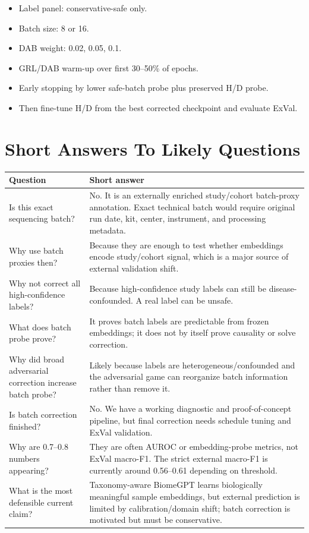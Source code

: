 \documentclass[11pt]{article}
\begin{document}
\begin{itemize}
  \item Label panel: conservative-safe only.
  \item Batch size: 8 or 16.
  \item DAB weight: 0.02, 0.05, 0.1.
  \item GRL/DAB warm-up over first 30--50\% of epochs.
  \item Early stopping by lower safe-batch probe plus preserved H/D probe.
  \item Then fine-tune H/D from the best corrected checkpoint and evaluate ExVal.
\end{itemize}

\section{Short Answers To Likely Questions}

\begin{longtable}{p{}p{}}
\toprule
Question & Short answer \\
\midrule
\endhead
Is this exact sequencing batch? &
No. It is an externally enriched study/cohort batch-proxy annotation. Exact technical
batch would require original run date, kit, center, instrument, and processing metadata. \\
Why use batch proxies then? &
Because they are enough to test whether embeddings encode study/cohort signal, which is a
major source of external validation shift. \\
Why not correct all high-confidence labels? &
Because high-confidence study labels can still be disease-confounded. A real label can be
unsafe. \\
What does batch probe prove? &
It proves batch labels are predictable from frozen embeddings; it does not by itself prove
causality or solve correction. \\
Why did broad adversarial correction increase batch probe? &
Likely because labels are heterogeneous/confounded and the adversarial game can reorganize
batch information rather than remove it. \\
Is batch correction finished? &
No. We have a working diagnostic and proof-of-concept pipeline, but final correction needs
schedule tuning and ExVal validation. \\
Why are 0.7--0.8 numbers appearing? &
They are often AUROC or embedding-probe metrics, not ExVal macro-F1. The strict external
macro-F1 is currently around 0.56--0.61 depending on threshold. \\
What is the most defensible current claim? &
Taxonomy-aware BiomeGPT learns biologically meaningful sample embeddings, but external
prediction is limited by calibration/domain shift; batch correction is motivated but must
be conservative. \\
\bottomrule
\end{longtable}
\end{document}
